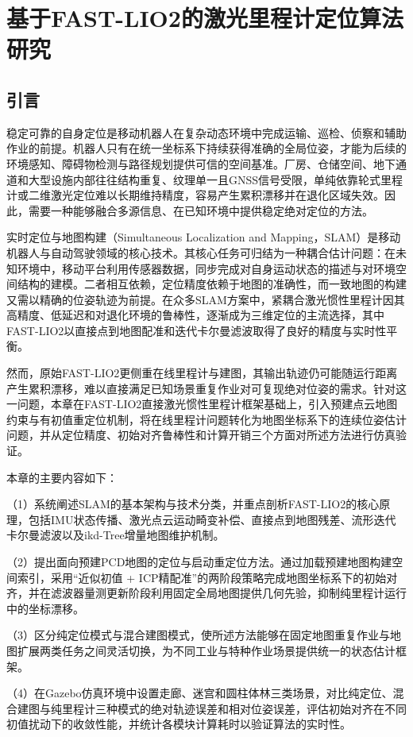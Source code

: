 \chapter{基于FAST-LIO2的激光里程计定位算法研究}
\section{引言}
稳定可靠的自身定位是移动机器人在复杂动态环境中完成运输、巡检、侦察和辅助作业的前提。机器人只有在统一坐标系下持续获得准确的全局位姿，才能为后续的环境感知、障碍物检测与路径规划提供可信的空间基准。厂房、仓储空间、地下通道和大型设施内部往往结构重复、纹理单一且GNSS信号受限，单纯依靠轮式里程计或二维激光定位难以长期维持精度，容易产生累积漂移并在退化区域失效。因此，需要一种能够融合多源信息、在已知环境中提供稳定绝对定位的方法。

实时定位与地图构建（Simultaneous Localization and Mapping，SLAM）是移动机器人与自动驾驶领域的核心技术。其核心任务可归结为一种耦合估计问题：在未知环境中，移动平台利用传感器数据，同步完成对自身运动状态的描述与对环境空间结构的建模。二者相互依赖，定位精度依赖于地图的准确性，而一致地图的构建又需以精确的位姿轨迹为前提。在众多SLAM方案中，紧耦合激光惯性里程计因其高精度、低延迟和对退化环境的鲁棒性，逐渐成为三维定位的主流选择，其中FAST-LIO2以直接点到地图配准和迭代卡尔曼滤波取得了良好的精度与实时性平衡。

然而，原始FAST-LIO2更侧重在线里程计与建图，其输出轨迹仍可能随运行距离产生累积漂移，难以直接满足已知场景重复作业对可复现绝对位姿的需求。针对这一问题，本章在FAST-LIO2直接激光惯性里程计框架基础上，引入预建点云地图约束与有初值重定位机制，将在线里程计问题转化为地图坐标系下的连续位姿估计问题，并从定位精度、初始对齐鲁棒性和计算开销三个方面对所述方法进行仿真验证。

本章的主要内容如下：

（1）系统阐述SLAM的基本架构与技术分类，并重点剖析FAST-LIO2的核心原理，包括IMU状态传播、激光点云运动畸变补偿、直接点到地图残差、流形迭代卡尔曼滤波以及ikd-Tree增量地图维护机制。

（2）提出面向预建PCD地图的定位与启动重定位方法。通过加载预建地图构建空间索引，采用“近似初值 + ICP精配准”的两阶段策略完成地图坐标系下的初始对齐，并在滤波器量测更新阶段利用固定全局地图提供几何先验，抑制纯里程计运行中的坐标漂移。

（3）区分纯定位模式与混合建图模式，使所述方法能够在固定地图重复作业与地图扩展两类任务之间灵活切换，为不同工业与特种作业场景提供统一的状态估计框架。

（4）在Gazebo仿真环境中设置走廊、迷宫和圆柱体林三类场景，对比纯定位、混合建图与纯里程计三种模式的绝对轨迹误差和相对位姿误差，评估初始对齐在不同初值扰动下的收敛性能，并统计各模块计算耗时以验证算法的实时性。

